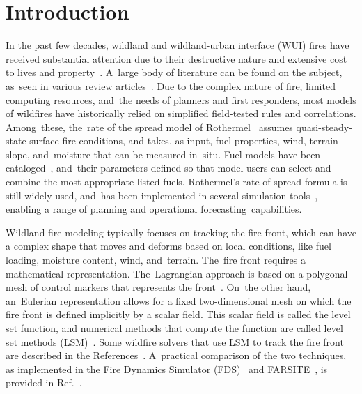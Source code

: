 \documentclass[atmosphere,article,accept,moreauthors,pdftex]{Definitions/mdpi}
\begin{document}
\section{Introduction}

In the past few decades, wildland and wildland-urban interface (WUI) fires have received substantial attention due to their destructive nature and extensive cost to lives and property~\cite{thomas_2017,mcdermott_2019,richards_2020}. A~large body of literature can be found on the subject, as~seen in various review articles~\cite{Papadopoulos_2011,Bakhshaii_2019,mcdermott_2019}. Due to the complex nature of fire, limited computing resources, and~the needs of planners and first responders, most models of wildfires have historically relied on simplified field-tested rules and correlations. Among~these, the~rate of the spread model of Rothermel~\cite{Rothermel:1972} assumes quasi-steady-state surface fire conditions, and takes, as input, fuel properties, wind, terrain slope, and~moisture that can be measured in~situ. Fuel models have been cataloged~\cite{Anderson:1982}, and~their parameters defined so that model users can select and combine the most appropriate listed fuels. Rothermel's rate of spread formula is still widely used, and~has been implemented in several simulation tools~\cite{Finney:FARSITE,Bova:IJWF2015,FDS_Users_Guide,Coen:2,Coen:2015,LAUTENBERGER_2013,coen_2013,Mandel:2009,Mandel:2011,Mandel:2014,Kochanski:2016}, enabling a range of planning and operational forecasting~capabilities.

Wildland fire modeling typically focuses on tracking the fire front, which can have a complex shape that moves and deforms based on local conditions, like fuel loading, moisture content, wind, and~terrain. The~fire front requires a mathematical representation. The~Lagrangian approach is based on a polygonal mesh of control markers that represents the front~\cite{Finney:FARSITE,Bova:IJWF2015}. On~the other hand, an~Eulerian representation allows for a fixed two-dimensional mesh on which the fire front is defined implicitly by a scalar field. This scalar field is called the level set function, and numerical methods that compute the function are called level set methods (LSM)~\cite{Sethian:1999,Osher:2006}. Some wildfire solvers that use LSM to track the fire front are described in the References~\cite{coen_2013,Bova:IJWF2015,FDS_Users_Guide,LAUTENBERGER_2013}. A~practical comparison of the two techniques, as implemented in the Fire Dynamics Simulator (FDS)~\cite{Mell:IJWF2007} and FARSITE~\cite{Finney:FARSITE}, is provided in Ref.~\cite{Bova:IJWF2015}.
\end{document}
